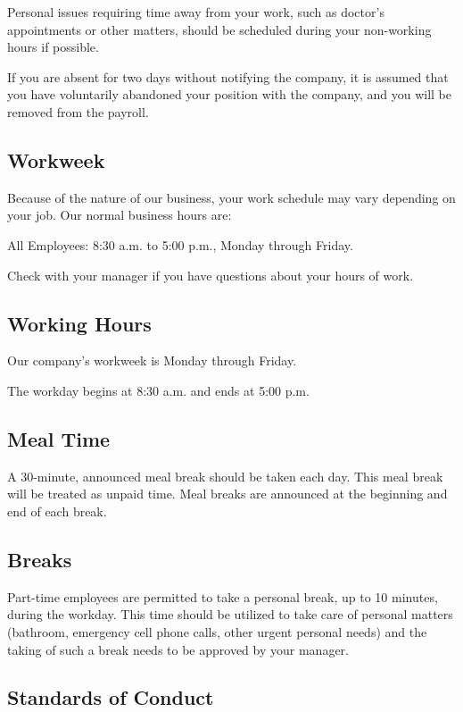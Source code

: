 Personal issues requiring time away from your work, such as doctor's appointments or other matters, should be scheduled during your non-working hours if possible.

If you are absent for two days without notifying the company, it is assumed that you have voluntarily abandoned your position with the company, and you will be removed from the payroll.

\subsection{Workweek}

Because of the nature of our business, your work schedule may vary depending on your job. Our normal business hours are:

All Employees: 8:30 a.m. to 5:00 p.m., Monday through Friday.

Check with your manager if you have questions about your hours of work.

\subsection{Working Hours}

Our company's workweek is Monday through Friday.

The workday begins at 8:30 a.m. and ends at 5:00 p.m.

\subsection{Meal Time}

A 30-minute, announced meal break should be taken each day. This meal break will be treated as unpaid time. Meal breaks are announced at the beginning and end of each break.

\subsection{Breaks}

Part-time employees are permitted to take a personal break, up to 10 minutes, during the workday. This time should be utilized to take care of personal matters (bathroom, emergency cell phone calls, other urgent personal needs) and the taking of such a break needs to be approved by your manager.

\subsection{Standards of Conduct}

